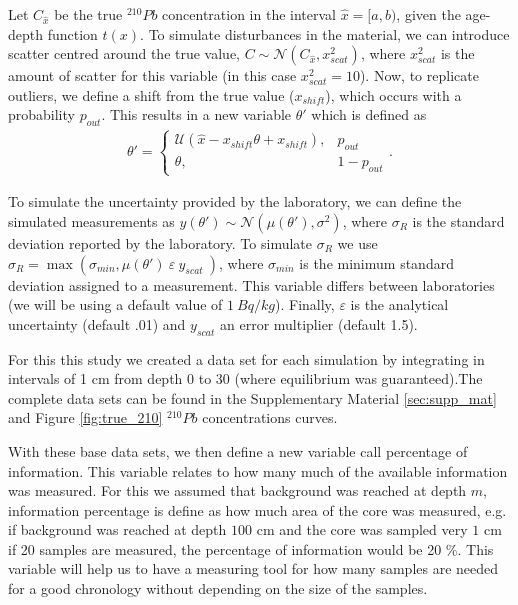 \documentclass [10pt] {article}
\begin{document}
	Let $C_{\hat{x}}$ be the true  $^{210}Pb$ concentration in the interval $\hat{x}=[a,b)$, given the age-depth function $t(x)$. To simulate disturbances in the material, we can introduce scatter centred around the true value, $C\sim \mathcal{N}\left(C_{\hat{x}},x^2_{scat}\right)$, where $x^2_{scat}$ is the amount of scatter for this variable (in this case $x^2_{scat}=10$). Now, to replicate outliers, we define a shift from the true value ($x_{shift}$), which occurs with a probability $p_{out}$. This results in a new variable $\theta'$ which is defined as
\begin{align}
	\theta' = \begin{cases}
			\mathcal{U}(\hat{x} - x_{shift}\theta + x_{shift}), &  p_{out} \\
			\theta, & 1-p_{out}
		\end{cases}.
\end{align}

	To simulate the uncertainty provided by the laboratory, we can define the simulated measurements as  $y(\theta')\sim\mathcal{N}\left(\mu(\theta'),\sigma^2\right)$, where $\sigma_R$ is the standard deviation reported by the laboratory. To simulate $\sigma_R$ we use $\sigma_R= \max \left(\sigma_{min}, \mu(\theta')~\varepsilon~y_{scat}~\right)$, where $\sigma_{min}$ is the minimum standard deviation assigned to a measurement. This variable differs between laboratories (we will be using a default value of $1~ Bq/kg$). Finally, $\varepsilon$ is the analytical uncertainty (default .01) and $y_{scat}$ an error multiplier (default 1.5).

	For this this study we created a data set for each simulation by integrating in intervals of 1 cm from depth 0 to 30 (where equilibrium was guaranteed).The complete data sets can be found in the Supplementary Material \ref{sec:supp_mat} and Figure \ref{fig:true_210} $^{210}Pb$ concentrations curves. 

	With these base data sets, we then define a new variable call percentage of information. This variable relates to how many much of the available information was measured. For this we assumed that background was reached at depth $m$, information percentage is define as how much area of the core was measured, e.g. if background was reached at depth $100$ cm and the core was sampled very $1$ cm if 20 samples are measured, the percentage of information would be 20 \%. This variable will help us to have a measuring tool for how many samples are needed for a good chronology without depending on the size of the samples. 
\end{document}
